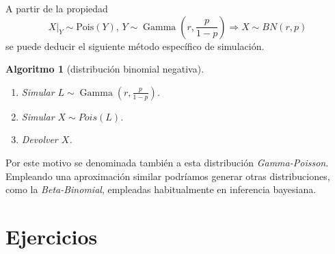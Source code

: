 \documentclass[
]{book}
\theoremstyle{break}
\newtheorem{conjecture}{Algoritmo}[chapter]
\theoremstyle{nonumberplain}
\begin{document}
A partir de la propiedad
\[X|_{Y} \sim \text{Pois}\left(  Y\right)  \text{, }Y \sim \operatorname{Gamma} \left( r, \frac{p}{1-p}\right)  \Rightarrow X \sim BN(r, p)\]
se puede deducir el siguiente método específico de simulación.

\begin{conjecture}[distribución binomial negativa]
\protect\hypertarget{cnj:bin-neg}{}\label{cnj:bin-neg}

\begin{enumerate}
\def\labelenumi{\arabic{enumi}.}
\item
  Simular \(L \sim \operatorname{Gamma}\left( r, \frac{p}{1-p} \right)\).
\item
  Simular \(X \sim Pois \left( L\right)\).
\item
  Devolver \(X\).
\end{enumerate}

\end{conjecture}

Por este motivo se denominada también a esta distribución \emph{Gamma-Poisson}. Empleando una aproximación similar podríamos generar otras distribuciones, como la \emph{Beta-Binomial}, empleadas habitualmente en inferencia bayesiana.

\hypertarget{ejercicios-discretas}{%
\section{Ejercicios}\label{ejercicios-discretas}}
\end{document}
